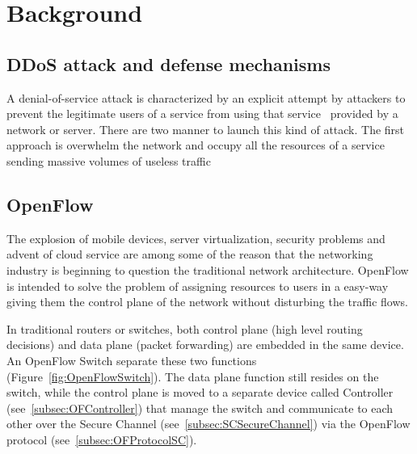 \chapter{Background}
\label{chapter:background} 



\section{DDoS attack and defense mechanisms}
\label{sec:BGDDoS}

A denial-of-service attack is characterized by an explicit attempt by attackers to prevent the legitimate users of a service from using that service~\cite{dosCert} provided by a network or server. There are two manner to launch this kind of attack. The first approach is overwhelm the network and occupy all the resources of a service sending massive volumes of useless traffic

\section{OpenFlow}
\label{sec:BGOpenFlow}

The explosion of mobile devices, server virtualization, security problems and advent of cloud service are among some of the reason that the networking industry is beginning to question the traditional network architecture. OpenFlow is intended to solve the problem of assigning resources to users in a easy-way giving them the control plane of the network without disturbing the traffic flows. 

\par 

In traditional routers or switches, both control plane (high level routing decisions) and data plane (packet forwarding) are embedded in the same device. An OpenFlow Switch separate these two functions (Figure~\ref{fig:OpenFlowSwitch}). The data plane function still resides on the switch, while the control plane is moved to a separate device called Controller (see~\ref{subsec:OFController}) that manage the switch and communicate to each other over the Secure Channel (see~\ref{subsec:SCSecureChannel}) via the OpenFlow protocol (see~\ref{subsec:OFProtocolSC}).

\par 

